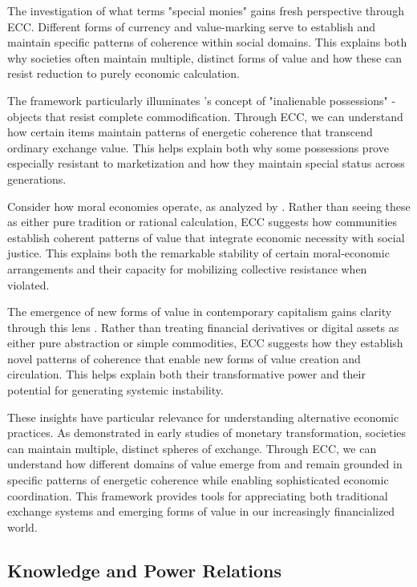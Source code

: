 The investigation of what \cite{zelizer1994social} terms "special monies" gains fresh perspective through ECC. Different forms of currency and value-marking serve to establish and maintain specific patterns of coherence within social domains. This explains both why societies often maintain multiple, distinct forms of value and how these can resist reduction to purely economic calculation.

The framework particularly illuminates \cite{weiner1992inalienable}'s concept of "inalienable possessions" - objects that resist complete commodification. Through ECC, we can understand how certain items maintain patterns of energetic coherence that transcend ordinary exchange value. This helps explain both why some possessions prove especially resistant to marketization and how they maintain special status across generations.

Consider how moral economies operate, as analyzed by \cite{thompson1971moral}. Rather than seeing these as either pure tradition or rational calculation, ECC suggests how communities establish coherent patterns of value that integrate economic necessity with social justice. This explains both the remarkable stability of certain moral-economic arrangements and their capacity for mobilizing collective resistance when violated.

The emergence of new forms of value in contemporary capitalism gains clarity through this lens \cite{appadurai1986social}. Rather than treating financial derivatives or digital assets as either pure abstraction or simple commodities, ECC suggests how they establish novel patterns of coherence that enable new forms of value creation and circulation. This helps explain both their transformative power and their potential for generating systemic instability.

These insights have particular relevance for understanding alternative economic practices. As \cite{bohannan1959impact} demonstrated in early studies of monetary transformation, societies can maintain multiple, distinct spheres of exchange. Through ECC, we can understand how different domains of value emerge from and remain grounded in specific patterns of energetic coherence while enabling sophisticated economic coordination. This framework provides tools for appreciating both traditional exchange systems and emerging forms of value in our increasingly financialized world.

\subsection{Knowledge and Power Relations}

